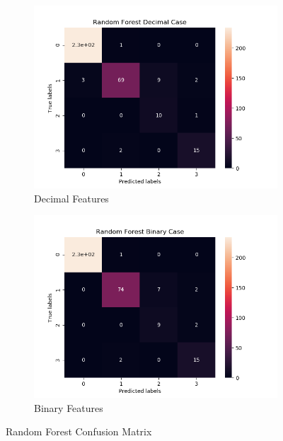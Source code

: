 \begin{figure}[H]
     \centering
     
     \begin{subfigure}[b]{0.48\textwidth}
         \centering
         \includegraphics[width=\textwidth]{../Figures/Random Forest Decimal Case_conf_mat.png}
         \caption{Decimal Features}
     \end{subfigure}
     \hfill
     \begin{subfigure}[b]{0.48\textwidth}
         \centering
         \includegraphics[width=\textwidth]{../Figures/Random Forest Binary Case_conf_mat.png}
         \caption{Binary Features}
     \end{subfigure}
     \caption{Random Forest Confusion Matrix}
\end{figure}

